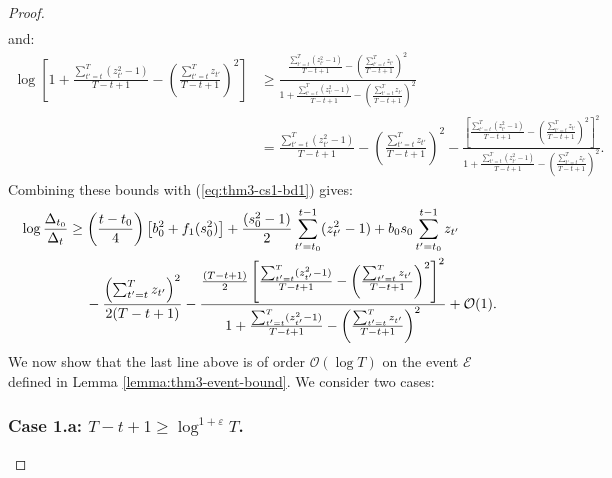 \begin{proof}
\begin{align*}
\end{align*}
\normalsize
and: 
\small
\begin{align*}
    \log\left[1 + \frac{\sum_{t'=t}^T (z_{t'}^2-1)}{T-t+1} - \left(\frac{\sum_{t'=t}^T z_{t'}}{T-t+1}\right)^2\right] &\geq \frac{\frac{\sum_{t'=t}^T (z_{t'}^2-1)}{T-t+1} - \left(\frac{\sum_{t'=t}^T z_{t'}}{T-t+1}\right)^2}{1 + \frac{\sum_{t'=t}^T (z_{t'}^2-1)}{T-t+1} - \left(\frac{\sum_{t'=t}^T z_{t'}}{T-t+1}\right)^2 } \\
    &= \frac{\sum_{t'=t}^T (z_{t'}^2-1)}{T-t+1} - \left(\frac{\sum_{t'=t}^T z_{t'}}{T-t+1}\right)^2 - \frac{\left[\frac{\sum_{t'=t}^T (z_{t'}^2-1)}{T-t+1} - \left(\frac{\sum_{t'=t}^T z_{t'}}{T-t+1}\right)^2 \right]^2}{1 + \frac{\sum_{t'=t}^T (z_{t'}^2-1)}{T-t+1} - \left(\frac{\sum_{t'=t}^T z_{t'}}{T-t+1}\right)^2 }.
\end{align*}
\normalsize
Combining these bounds with (\ref{eq:thm3-cs1-bd1}) gives: 
\begin{align}
    \log \frac{\Delta_{t_0}}{\Delta_t} &\geq \left(\frac{t-t_0}{4}\right)\left[b_0^2 + f_1(s_0^2)\right]  + \frac{(s_0^2-1)}{2} \sum_{t' = t_0}^{t - 1} (z_{t'}^2-1) + b_0 s_0 \sum_{t' = t_0}^{t - 1} z_{t'} \notag \\
    &\quad\:  - \frac{\left(\sum_{t'=t}^T z_{t'}\right)^2}{2(T-t+1)} - \frac{\frac{(T-t+1)}{2}\left[\frac{\sum_{t'=t}^T (z_{t'}^2-1)}{T-t+1} - \left(\frac{\sum_{t'=t}^T z_{t'}}{T-t+1}\right)^2 \right]^2}{1 + \frac{\sum_{t'=t}^T (z_{t'}^2-1)}{T-t+1} - \left(\frac{\sum_{t'=t}^T z_{t'}}{T-t+1}\right)^2 } + \mathcal{O}(1). \label{eq:thm3-cs1-bd2}
\end{align}
We now show that the last line above is of order $\mathcal{O}(\log T)$ on the event $\mathcal{E}$ defined in Lemma \ref{lemma:thm3-event-bound}. We consider two cases: 

\subsubsection*{Case 1.a: $T -t+1 \geq \log^{1+\varepsilon} T$.}


\end{proof}
